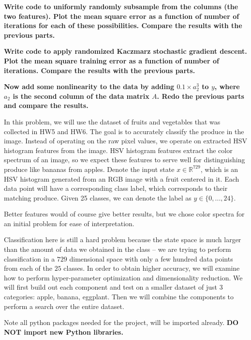 \begin{Parts}
\textbf{Write code to uniformly randomly subsample from the columns
  (the two features). Plot the mean square error as a function of
  number of iterations for each of these possibilities. Compare the
  results with the previous parts.} 



\Part \textbf{Write code to apply randomized Kaczmarz stochastic
  gradient descent. Plot the mean square training error as a function of number of iterations. Compare the results with the previous parts.}



\Part \textbf{Now add some nonlinearity to the data by adding $0.1 \times a_2^3$ to $y$, where $a_2$ is the second column of the data matrix $A$. Redo the previous parts and compare the results.}



\end{Parts}
In this problem, we will use the dataset of fruits and vegetables that
was collected in HW5 and HW6. The goal is to accurately classify the
produce in the image. Instead of operating on the raw pixel values, we
operate on extracted HSV histogram features from the image. HSV
histogram features extract the color spectrum of an image, so we
expect these features to serve well for distinguishing produce like
bananas from apples. Denote the input state $x \in \mathbb{R}^{729}$,
which is an HSV histogram generated from an RGB image with a fruit
centered in it. Each data point will have a corresponding class label,
which corresponds to their matching produce. Given 25 classes, we can
denote the label as $y \in \lbrace 0,...,24 \rbrace$. 

Better features would of course give better results, but we chose
color spectra for an initial problem for ease of interpretation.


Classification here is still a hard problem because the state space is
much larger than the amount of data we obtained in the class -- we are
trying to perform classification in a $729$ dimensional space with only a few hundred data points from each of the $25$ classes. In order to obtain higher accuracy, we will examine how to perform hyper-parameter optimization and dimensionality reduction. We will first build out each component and test on a smaller dataset of just 3 categories: apple, banana, eggplant. Then we will combine the components to perform a search over the entire dataset.


Note all python packages needed for the project, will be imported already. {\bf DO NOT import new Python libraries.}




